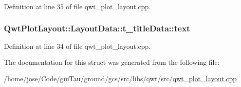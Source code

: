 Definition at line 35 of file qwt\-\_\-plot\-\_\-layout.\-cpp.

\hypertarget{struct_qwt_plot_layout_1_1_layout_data_1_1t__title_data_ab98445fdee569ffdee00ff87b6276d29}{
\subsubsection[{text}]{ Qwt\-Plot\-Layout\-::\-Layout\-Data\-::t\-\_\-title\-Data\-::text}}\label{struct_qwt_plot_layout_1_1_layout_data_1_1t__title_data_ab98445fdee569ffdee00ff87b6276d29}


Definition at line 34 of file qwt\-\_\-plot\-\_\-layout.\-cpp.



The documentation for this struct was generated from the following file\-:\begin{DoxyCompactItemize}
\item 
/home/jose/\-Code/gui\-Tau/ground/gcs/src/libs/qwt/src/\hyperlink{qwt__plot__layout_8cpp}{qwt\-\_\-plot\-\_\-layout.\-cpp}\end{DoxyCompactItemize}
